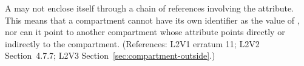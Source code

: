 A \Compartment may not enclose itself through a chain of references
involving the  attribute.  This means that a compartment cannot
have its own identifier as the value of , nor can it point
to another compartment whose  attribute points directly or
indirectly to the compartment.  (References: L2V1 erratum 11; L2V2 Section~4.7.7;
L2V3 Section~\ref{sec:compartment-outside}.)
